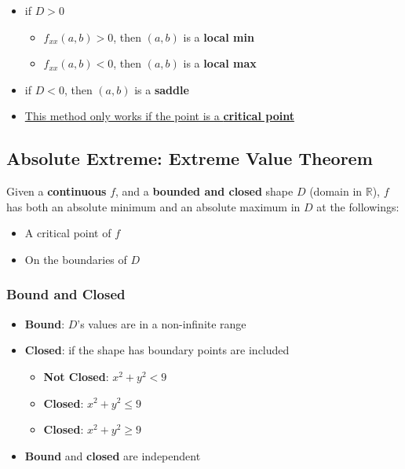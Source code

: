     \begin{itemize}
      \item if $ D > 0 $
      \begin{itemize}
        \item $ f_{xx} (a, b) > 0 $, then $ (a, b) $ is a \textbf{local min}
        \item $ f_{xx} (a, b) < 0 $, then $ (a, b) $ is a \textbf{local max}
      \end{itemize}

      \item if $ D < 0 $, then $ (a, b) $ is a \textbf{saddle}
      \item \ul{This method only works if the point is a \textbf{critical point}}
    \end{itemize}

  \subsection{Absolute Extreme: Extreme Value Theorem}

    Given a \textbf{continuous} $ f $, and a \textbf{bounded and closed}
    shape $ D $ (domain in $ \mathbb{R} $), $ f $ has both an absolute minimum
    and an absolute maximum in $ D $ at the followings:
    \begin{itemize}
      \item A critical point of $ f $
      \item On the boundaries of $ D $
    \end{itemize}

    \subsubsection{Bound and Closed}

      \begin{itemize}
        \item \textbf{Bound}: $ D $'s values are in a non-infinite range
        \item \textbf{Closed}: if the shape has boundary points are included
        \begin{itemize}
          \item \textbf{Not Closed}: $ x^{2} + y^{2} < 9 $
          \item \textbf{Closed}: $ x^{2} + y^{2} \le 9 $
          \item \textbf{Closed}: $ x^{2} + y^{2} \ge 9 $
        \end{itemize}

        \item \textbf{Bound} and \textbf{closed} are independent
      \end{itemize}

